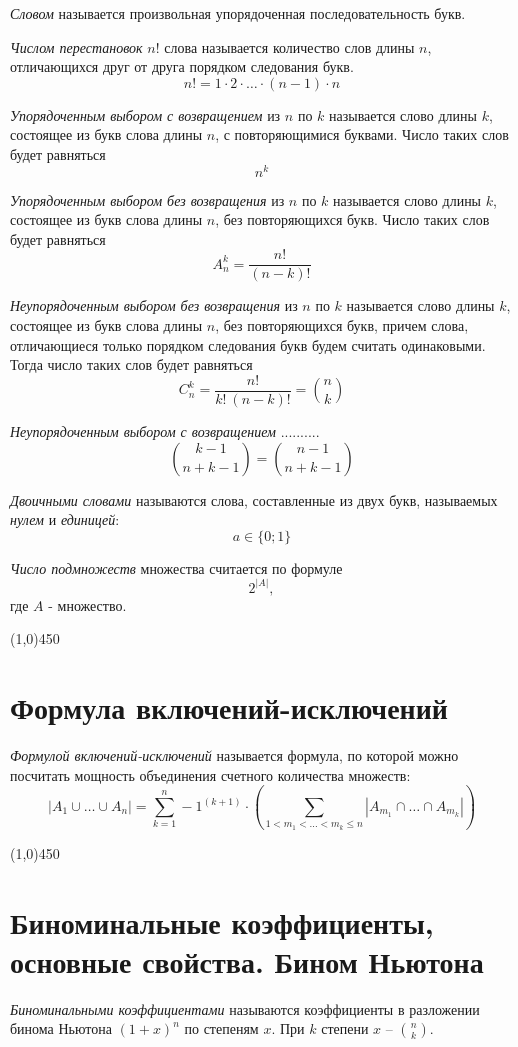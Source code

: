 \documentclass[a4paper,12pt]{article}
\begin{document}
	\textit{Словом} называется произвольная упорядоченная последовательность букв.
	
	\textit{Числом перестановок} $n!$ слова называется количество слов длины $n$, отличающихся друг от друга порядком следования букв.
	\[
	n! = 1 \cdot 2 \cdot \ldots \cdot (n - 1) \cdot n
	\]
	
	\textit{Упорядоченным выбором с возвращением} из $n$ по $k$ называется слово длины $k$, состоящее из букв слова длины $n$, с повторяющимися буквами. Число таких слов будет равняться 
	\[
	n^k
	\]
	
	\textit{Упорядоченным выбором без возвращения} из $n$ по $k$ называется слово длины $k$, состоящее из букв слова длины $n$, без повторяющихся букв. Число таких слов будет равняться
	\[
	A_n^k = \frac{n!}{(n - k)!}
	\]
	
	\textit{Неупорядоченным выбором без возвращения} из $n$ по $k$ называется слово длины $k$, состоящее из букв слова длины $n$, без повторяющихся букв, причем слова, отличающиеся только порядком следования букв будем считать одинаковыми. Тогда число таких слов будет равняться 
	\[
	C_n^k = \frac{n!}{k! \ (n - k)!} = {n \choose k}
	\]
	
	\textit{Неупорядоченным выбором с возвращением} ..........
	\[
	{k - 1 \choose n + k - 1} = {n - 1 \choose n + k - 1}
	\]
	
	\textit{Двоичными словами} называются слова, составленные из двух букв, называемых \textit{нулем} и \textit{единицей}:
	\[
	a \in \{0; 1\}
	\]
	

	\textit{Число подмножеств} множества считается по формуле 
	\[
	2 ^ {|A|},
	\]
	где $A$ - множество.
	\begin{center}
		\line(1,0){450}
	\end{center}

	\section*{Формула включений-исключений}
	\textit{Формулой включений-исключений} называется формула, по которой можно посчитать мощность объединения счетного количества множеств:
	\[
	|A_1 \cup \ldots \cup A_n| = \sum_{k = 1}^{n} -1^{(k + 1)} \cdot (\sum_{1 < m_1 < \ldots <m_k \leq n} |A_{m_1} \cap \ldots \cap A_{m_k}|)
	\]
	
	\begin{center}
		\line(1,0){450}
	\end{center}
	
	\section*{Биноминальные коэффициенты, основные свойства. Бином Ньютона}
	\textit{Биноминальными коэффициентами} называются коэффициенты в разложении бинома Ньютона $(1 + x)^n$ по степеням $x$. При $k$ степени $x$ -- ${n \choose k}$.
	
\end{document}
